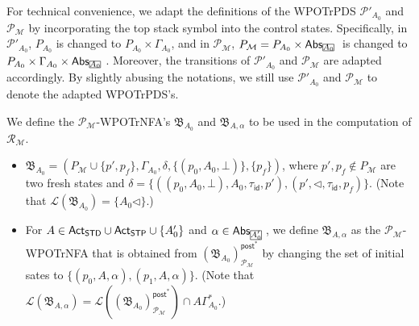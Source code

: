 \documentclass[preprint,12pt]{elsarticle}
\newcommand\rectangled[1]{\tikz[baseline=(torect.base)]{
    \node[shape = rectangle, draw, inner sep=0pt, outer sep = 0pt] (torect) {#1}
    }
}
\newcommand{\mrectangled}[1]{\text{\rectangled{\ensuremath{#1}}}}
\newcommand{\mhcancel}[1]{\mrectangled{#1}}
\newcommand\Mm{{\mathcal{M} }}
\newcommand\Pp{{\mathcal{P} }}
\newcommand\act{{\sf Act}}
\newcommand\standard{{\sf STD}}
\newcommand\singletop{{\sf STP}}
\newcommand\post{{\mathsf{post} }}
\newcommand\abs{{\mathsf{Abs} }}
\newcommand\AutReach{\mathscr{R}}
\newcommand{\id}{\mathsf{id}}
\newcommand\AutB{{\mathfrak{B} }}
\newcommand\Lang{{\mathscr{L} }}
\newcommand{\WOTrPDS}{\textsf{WPOTrPDS}}
\newcommand{\WOTrNFA}{\textsf{WPOTrNFA}}
\begin{document}
For technical convenience, we adapt the definitions of the {\WOTrPDS} $\Pp'_{A_0}$ and $\Pp_\Mm$ by incorporating the top stack symbol into the control states. Specifically, in $\Pp'_{A_0}$, $P_{A_0}$ is changed to $P_{A_0} \times \Gamma_{A_0}$, and in $\Pp_\Mm$, $P_\Mm = P_{A_0} \times \abs_{\mhcancel{A_0}}$ is changed to $P_{A_0} \times \Gamma_{A_0} \times \abs_{\mhcancel{A_0}}$.  Moreover, the transitions of $\Pp'_{A_0}$ and $\Pp_{\Mm}$ are adapted accordingly. By slightly abusing the notations, we still use $\Pp'_{A_0}$ and $\Pp_\Mm$ to denote the adapted {\WOTrPDS}'s.

We define the $\Pp_\Mm$-{\WOTrNFA}'s $\AutB_{A_0}$ and $\AutB_{A, \alpha}$ to be used in the computation of $\AutReach_\Mm$. 
\begin{itemize}
\item $\AutB_{A_0} = (P_\Mm \cup \{p', p_f\}, \Gamma_{A_0}, \delta, \{(p_0, A_0, \bot)\}, \{p_f\})$, where $p', p_f \not \in P_\Mm$ are two fresh states and $\delta = \{((p_0, A_0, \bot), A_0, \tau_{\id}, p'), (p', \triangleleft, \tau_{\id}, p_f)\}$. (Note that $\Lang(\AutB_{A_0}) = \{A_0 \triangleleft\}$.)
%
\item For $A \in \act_\standard \cup \act_\singletop \cup \{A'_0\}$ and $\alpha \in \abs_{\mhcancel{A'_0}}$, we define $\AutB_{A, \alpha}$ as the $\Pp_\Mm$-{\WOTrNFA} that is obtained from $(\AutB_{A_0})^{\post^*}_{\Pp_{\Mm}}$ by changing the set of initial sates to $\{(p_0, A, \alpha), (p_1, A, \alpha)\}$. (Note that $\Lang(\AutB_{A, \alpha}) = \Lang((\AutB_{A_0})^{\post^*}_{\Pp_{\Mm}}) \cap A \Gamma^*_{A_0}$.)
\end{itemize}
\end{document}
